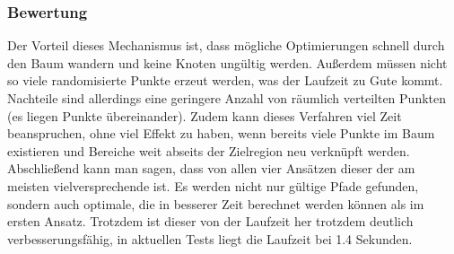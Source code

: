 \subsubsection{Bewertung}
Der Vorteil dieses Mechanismus ist, dass mögliche Optimierungen schnell durch den Baum wandern und keine Knoten ungültig werden. Außerdem müssen nicht so viele randomisierte Punkte erzeut werden, was der Laufzeit zu Gute kommt.\\
 Nachteile sind allerdings eine geringere Anzahl von räumlich verteilten Punkten (es liegen Punkte \glqq übereinander\grqq). Zudem kann dieses Verfahren viel Zeit beanspruchen, ohne viel Effekt zu haben, wenn bereits viele Punkte im Baum existieren und Bereiche weit abseits der Zielregion neu verknüpft werden. \\
 Abschließend kann man sagen, dass von allen vier Ansätzen dieser der am meisten vielversprechende ist. Es werden nicht nur gültige Pfade gefunden, sondern auch optimale, die in besserer Zeit berechnet werden können als im ersten Ansatz. Trotzdem ist dieser von der Laufzeit her trotzdem deutlich verbesserungsfähig, in aktuellen Tests liegt die Laufzeit bei 1.4 Sekunden.



